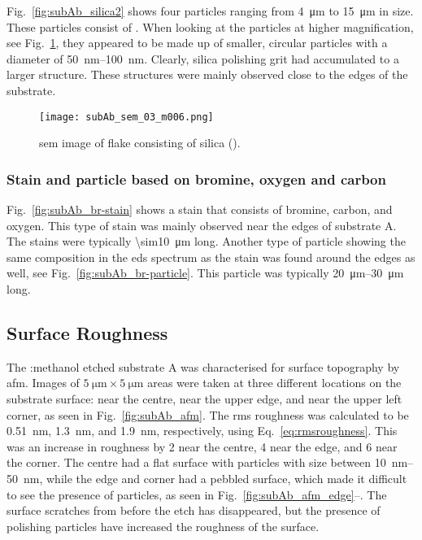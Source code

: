 Fig.~\ref{fig:subAb_silica2} shows four particles ranging from \SI{4}{\micro\metre} to \SI{15}{\micro\metre} in size. These particles consist of . When looking at the particles at higher magnification, see Fig.~\ref{fig:subAb_silica2_magnified}, they appeared to be made up of smaller, circular particles with a diameter of \SIrange{50}{100}{\nano\metre}. Clearly, silica polishing grit had accumulated to a larger structure. These structures were mainly observed close to the edges of the substrate.

\begin{figure}
    \centering
    \texttt{[image: subAb\_sem\_03\_m006.png]}
    \caption[\Ac{sem} image of silica flake.]{\Ac{sem} image of flake consisting of silica ().}\label{fig:subAb_silica2_magnified}
\end{figure}

\subsubsection{Stain and particle based on bromine, oxygen and carbon}

Fig.~\ref{fig:subAb_br-stain} shows a stain that consists of bromine, carbon, and oxygen. This type of stain was mainly observed  near the edges of substrate A. The stains were typically \SI{\sim10}{\micro\metre} long. Another type of particle showing the same composition in the \ac{eds} spectrum as the stain was found around the edges as well, see Fig.~\ref{fig:subAb_br-particle}. This particle was typically \SIrange{20}{30}{\micro\metre} long.

\subsection{Surface Roughness}

The :methanol etched substrate A was characterised for surface topography by \ac{afm}. Images of $\SI{5}{\micro\metre}\times\SI{5}{\micro\metre}$ areas were taken at three different locations on the substrate surface: near the centre, near the upper edge, and near the upper left corner, as seen in Fig.~\ref{fig:subAb_afm}. The \ac{rms} roughness was calculated to be \SI{0.51}{\nano\metre}, \SI{1.3}{\nano\metre}, and \SI{1.9}{\nano\metre}, respectively, using Eq.~\ref{eq:rmsroughness}. This was an increase in roughness by 2 near the centre, 4 near the edge, and 6 near the corner. The centre had a flat surface with particles with size between \SIrange{10}{50}{\nano\metre}, while the edge and corner had a pebbled surface, which made it difficult to see the presence of particles, as seen in Fig.~\ref{fig:subAb_afm_edge}--. The surface scratches from before the etch has disappeared, but the presence of polishing particles have increased the roughness of the surface.

